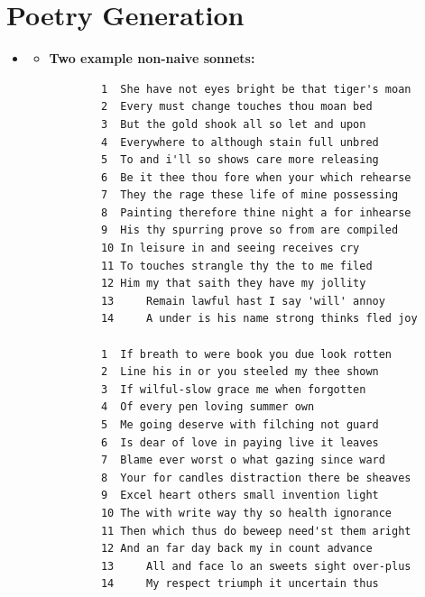 
\pagebreak

\section{Poetry Generation}
\medskip
\begin{itemize}

    \item {}

    \begin{itemize}
    \item \textbf{Two example non-naive sonnets:}
    \begin{verbatim}
        1  She have not eyes bright be that tiger's moan
        2  Every must change touches thou moan bed
        3  But the gold shook all so let and upon
        4  Everywhere to although stain full unbred
        5  To and i'll so shows care more releasing
        6  Be it thee thou fore when your which rehearse
        7  They the rage these life of mine possessing
        8  Painting therefore thine night a for inhearse
        9  His thy spurring prove so from are compiled
        10 In leisure in and seeing receives cry
        11 To touches strangle thy the to me filed
        12 Him my that saith they have my jollity
        13     Remain lawful hast I say 'will' annoy
        14     A under is his name strong thinks fled joy

        1  If breath to were book you due look rotten
        2  Line his in or you steeled my thee shown
        3  If wilful-slow grace me when forgotten
        4  Of every pen loving summer own
        5  Me going deserve with filching not guard
        6  Is dear of love in paying live it leaves
        7  Blame ever worst o what gazing since ward
        8  Your for candles distraction there be sheaves
        9  Excel heart others small invention light
        10 The with write way thy so health ignorance
        11 Then which thus do beweep need'st them aright
        12 And an far day back my in count advance
        13     All and face lo an sweets sight over-plus
        14     My respect triumph it uncertain thus
    \end{verbatim}


\end{itemize}
\end{itemize}
